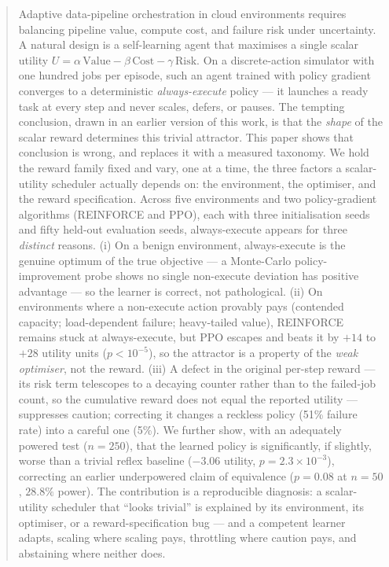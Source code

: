\documentclass[10pt,twocolumn]{article}
\begin{document}
\begin{abstract}
\noindent
Adaptive data-pipeline orchestration in cloud environments requires balancing
pipeline value, compute cost, and failure risk under uncertainty. A natural
design is a self-learning agent that maximises a single scalar utility
$U=\alpha\,\mathrm{Value}-\beta\,\mathrm{Cost}-\gamma\,\mathrm{Risk}$. On a
discrete-action simulator with one hundred jobs per episode, such an agent
trained with policy gradient converges to a deterministic \emph{always-execute}
policy --- it launches a ready task at every step and never scales, defers, or
pauses. The tempting conclusion, drawn in an earlier version of this work, is
that the \emph{shape} of the scalar reward determines this trivial attractor.
This paper shows that conclusion is wrong, and replaces it with a measured
taxonomy. We hold the reward family fixed and vary, one at a time, the three
factors a scalar-utility scheduler actually depends on: the environment, the
optimiser, and the reward specification. Across five environments and two
policy-gradient algorithms (REINFORCE and PPO), each with three initialisation
seeds and fifty held-out evaluation seeds, always-execute appears for three
\emph{distinct} reasons. (i) On a benign environment, always-execute is the
genuine optimum of the true objective --- a Monte-Carlo policy-improvement probe
shows no single non-execute deviation has positive advantage --- so the learner
is correct, not pathological. (ii) On environments where a non-execute action
provably pays (contended capacity; load-dependent failure; heavy-tailed value),
REINFORCE remains stuck at always-execute, but PPO escapes and beats it by
$+14$ to $+28$ utility units ($p<10^{-5}$), so the attractor is a property of the
\emph{weak optimiser}, not the reward. (iii) A defect in the original per-step
reward --- its risk term telescopes to a decaying counter rather than to the
failed-job count, so the cumulative reward does not equal the reported utility
--- suppresses caution; correcting it changes a reckless policy (51\% failure
rate) into a careful one (5\%). We further show, with an adequately powered test
($n{=}250$), that the learned policy is significantly, if slightly, worse than a
trivial reflex baseline ($-3.06$ utility, $p=2.3\times10^{-3}$), correcting an
earlier underpowered claim of equivalence ($p=0.08$ at $n{=}50$, $28.8\%$ power).
The contribution is a reproducible diagnosis: a scalar-utility scheduler that
``looks trivial'' is explained by its environment, its optimiser, or a
reward-specification bug --- and a competent learner adapts, scaling where
scaling pays, throttling where caution pays, and abstaining where neither does.
\end{abstract}
\end{document}
